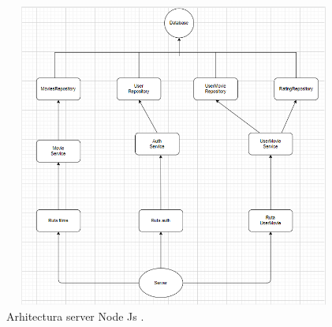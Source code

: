 		\begin{figure}[htbp]
			\centerline{\includegraphics[width=13cm, height=10cm]{figures/diagrama clase node js.png}}
			\caption{Arhitectura server Node Js .}
			\label{fig}
		\end{figure}

